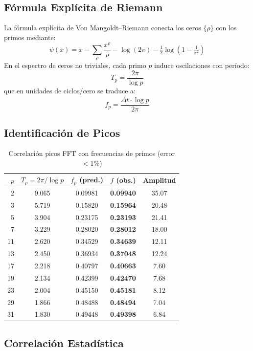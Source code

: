 \documentclass[12pt, a4paper]{article}
\begin{document}
\subsection{Fórmula Explícita de Riemann}

La fórmula explícita de Von Mangoldt–Riemann conecta los ceros $\{\rho\}$
con los primos mediante:
\[
  \psi(x) = x - \sum_{\rho} \frac{x^\rho}{\rho} - \log(2\pi) - \tfrac{1}{2}\log\!\left(1-\tfrac{1}{x^2}\right)
\]
En el espectro de ceros no triviales, cada primo $p$ induce oscilaciones
con período:
\[
  T_p = \frac{2\pi}{\log p}
\]
que en unidades de ciclos/cero se traduce a:
\[
  f_p = \frac{\bar{\Delta t} \cdot \log p}{2\pi}
\]

\subsection{Identificación de Picos}

\begin{table}[H]
\centering
\caption{Correlación picos FFT con frecuencias de primos (error $< 1\%$)}
\begin{tabular}{rcccc}
\toprule
$p$ & $T_p = 2\pi/\log p$ & $f_p$ (pred.) & $f$ (obs.) & Amplitud \\
\midrule
 2 & 9.065 & 0.09981 & \textbf{0.09940} & 35.07 \\
 3 & 5.719 & 0.15820 & \textbf{0.15964} & 20.48 \\
 5 & 3.904 & 0.23175 & \textbf{0.23193} & 21.41 \\
 7 & 3.229 & 0.28020 & \textbf{0.28012} & 18.00 \\
11 & 2.620 & 0.34529 & \textbf{0.34639} & 12.11 \\
13 & 2.450 & 0.36934 & \textbf{0.37048} & 12.24 \\
17 & 2.218 & 0.40797 & \textbf{0.40663} &  7.60 \\
19 & 2.134 & 0.42399 & \textbf{0.42470} &  7.68 \\
23 & 2.004 & 0.45150 & \textbf{0.45181} &  8.12 \\
29 & 1.866 & 0.48488 & \textbf{0.48494} &  7.04 \\
31 & 1.830 & 0.49448 & \textbf{0.49398} &  6.84 \\
\bottomrule
\end{tabular}
\end{table}

\subsection{Correlación Estadística}
\end{document}
